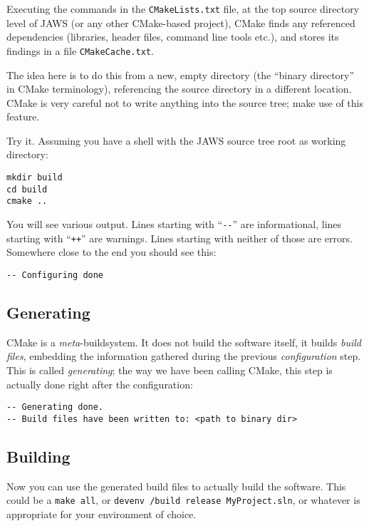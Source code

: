 Executing the commands in the \lstinline{CMakeLists.txt} file, at the top source directory level of JAWS (or any other CMake-based project), CMake finds any referenced dependencies (libraries, header files, command line tools etc.), and stores its findings in a file \lstinline{CMakeCache.txt}.

The idea here is to do this from a new, empty directory (the ``binary directory'' in CMake terminology), referencing the source directory in a different location. CMake is very careful not to write anything into the source tree; make use of this feature.

Try it. Assuming you have a shell with the JAWS source tree root as working directory:

\begin{lstlisting}
mkdir build
cd build
cmake ..
\end{lstlisting}

You will see various output. Lines starting with ``\lstinline{--}'' are informational, lines starting with ``\lstinline{++}'' are warnings. Lines starting with neither of those are errors. Somewhere close to the end you should see this:

\begin{lstlisting}
-- Configuring done
\end{lstlisting}

\subsection{Generating}

CMake is a \emph{meta}-buildsystem. It does not build the software itself, it builds \emph{build files}, embedding the information gathered during the previous \emph{configuration} step. This is called \emph{generating}; the way we have been calling CMake, this step is actually done right after the configuration:

\begin{lstlisting}
-- Generating done.
-- Build files have been written to: <path to binary dir>
\end{lstlisting}

\subsection{Building}

Now you can use the generated build files to actually build the software. This could be a \lstinline{make all}, or \lstinline{devenv /build release MyProject.sln}, or whatever is appropriate for your environment of choice.

